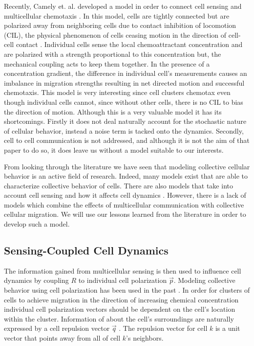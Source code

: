 \documentclass[a4paper]{article}
\begin{document}
Recently, Camely et. al. developed a model in order to connect cell sensing and multicellular chemotaxis \cite{camley2015emergent}. In this model, cells are tightly connected but are polarized away from neighboring cells due to contact inhibition of locomotion (CIL), the physical phenomenon of cells ceasing motion in the direction of cell-cell contact \cite{mayor2010keeping}. Individual cells sense the local chemoattractant concentration and are polarized with a strength proportional to this concentration but, the mechanical coupling acts to keep them together. In the presence of a concentration gradient, the difference in individual cell's measurements causes an imbalance in migration strengths resulting in net directed motion and successful chemotaxis. This model is very interesting since cell clusters chemotax even though individual cells cannot, since without other cells, there is no CIL to bias the direction of motion. Although this is a very valuable model it has its shortcomings. Firstly it does not deal naturally account for the stochastic nature of cellular behavior, instead a noise term is tacked onto the dynamics. Secondly, cell to cell communication is not addressed, and although it is not the aim of that paper to do so, it does leave us without a model suitable to our interests.

From looking through the literature we have seen that modeling collective cellular behavior is an active field of research. Indeed, many models exist that are able to characterize collective behavior of cells. There are also models that take into account cell sensing and how it affects cell dynamics \cite{coburn2013tactile,camley2015emergent}. However, there is a lack of models which combine the effects of multicellular communication with collective cellular migration. We will use our lessons learned from the literature in order to develop such a model.

\subsection{Sensing-Coupled Cell Dynamics}

The information gained from multicellular sensing is then used to influence cell dynamics by coupling $R$ to individual cell polarization $\vec{p}$. Modeling collective behavior using cell polarization has been used in the past \cite{szabo2010collective,camley2015emergent}. In order for clusters of cells to achieve migration in the direction of increasing chemical concentration individual cell polarization vectors should be dependent on the cell's location within the cluster. Information of about the cell's surroundings are naturally expressed by a cell repulsion vector $\vec{q}$ \cite{camley2015emergent}. The repulsion vector for cell $k$ is a unit vector that points away from all of cell $k$'s neighbors.
\end{document}
